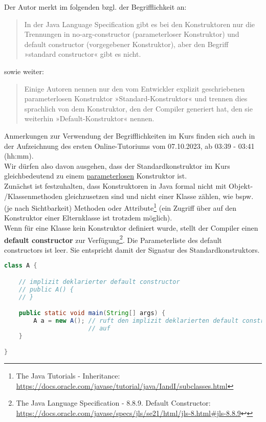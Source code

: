 Der Autor merkt im folgenden bzgl. der Begrifflichkeit an:

\blockquote[{\cite[516]{Ull12}}]{
    In der Java Language Specification gibt es bei den Konstruktoren nur die Trennungen in no-arg-constructor
    (parameterloser Konstruktor) und default constructor (vorgegebener Konstruktor), aber den Begriff
    »standard constructor« gibt es nicht.
}

sowie weiter:

\blockquote[{\cite[517]{Ull12}}]{
    Einige Autoren nennen nur den vom Entwickler explizit geschriebenen parameterlosen Konstruktor »Standard-Konstruktor«
    und trennen dies sprachlich von dem Konstruktor, den der Compiler generiert hat, den sie weiterhin »Default-Konstruktor« nennen.
}

Anmerkungen zur Verwendung der Begrifflichkeiten im Kurs finden sich auch in der Aufzeichnung des ersten Online-Tutoriums
vom 07.10.2023, ab 03:39 - 03:41 (hh:mm).\\

Wir dürfen also davon ausgehen, dass der Standardkonstruktor im Kurs gleichbedeutend zu einem \underline{parameterlosen}
Konstruktor ist.\\

Zunächst ist festzuhalten, dass Konstruktoren in Java formal nicht mit Objekt- /Klassenmethoden gleichzusetzen sind
und nicht  einer Klasse zählen, wie bspw. (je nach Sichtbarkeit) Methoden oder Attribute\footnote{
    The Java Tutorials - Inheritance: \url{https://docs.oracle.com/javase/tutorial/java/IandI/subclasses.html}
} (ein Zugriff über  auf den Konstruktor einer Elternklasse ist trotzdem möglich).\\

Wenn für eine Klasse kein Konstruktor definiert wurde, stellt der Compiler einen \textbf{default constructor}
zur Verfügung\footnote{
    The Java Language Specification - 8.8.9. Default Constructor: \url{https://docs.oracle.com/javase/specs/jls/se21/html/jls-8.html#jls-8.8.9}↩
}.
Die Parameterliste des default constructors ist leer.
Sie entspricht damit der Signatur des Standardkonstruktors.

\begin{lstlisting}[language=java]
class A {

    // implizit deklarierter default constructor
    // public A() {
    // }

    public static void main(String[] args) {
        A a = new A(); // ruft den implizit deklarierten default constructor
                       // auf
    }

}
\end{lstlisting}

